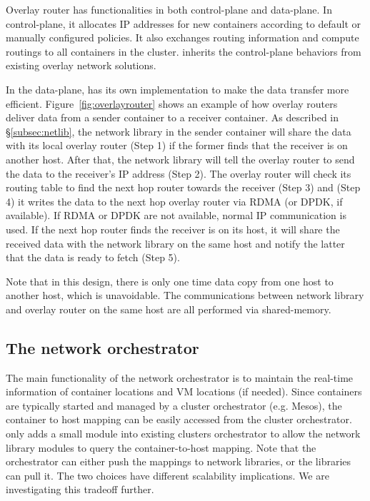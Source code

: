 Overlay router has functionalities in both control-plane and data-plane.
In control-plane, it allocates IP addresses for new containers according to
default or manually configured policies. It also exchanges routing information
and compute routings to all containers in the cluster. \sysname inherits 
the control-plane behaviors from existing overlay network solutions.

In the data-plane, \sysname has its own implementation to make the data transfer
more efficient. Figure~\ref{fig:overlayrouter} shows an example of how 
overlay routers deliver data from a sender container to a receiver container.
As described in \S\ref{subsec:netlib},
the network library in the sender container will share the data with
its local overlay router (Step 1) if the former finds that the receiver 
is on another host. After that, the network library will tell
the overlay router to send the data to the receiver's IP address (Step 2).
The overlay router will check its routing table to find the next hop router
towards the receiver (Step 3) and (Step 4) it writes the data to the next hop overlay
router via RDMA (or DPDK, if available). If RDMA or DPDK are not available,
normal IP communication is used. If the next hop router finds the receiver is on its
host, it will share the received data with the network library on the same host
and notify the latter that the data is ready to fetch (Step 5).

Note that in this design, there is only one time data copy from one host
to another host, which is unavoidable. The communications between network library
and overlay router on the same host are all performed via shared-memory.

\subsection{The network orchestrator}

The main functionality of the network orchestrator is to maintain the real-time
information of container locations and VM locations (if needed).  Since
containers are typically started and managed by a cluster orchestrator (e.g.
Mesos), the container to host mapping can be easily accessed from the cluster
orchestrator. \sysname only adds a small module into existing clusters
orchestrator to allow the network library modules to query the container-to-host
mapping. Note that the orchestrator can either push the mappings to network
libraries, or the libraries can pull it. The two choices have different
scalability implications. We are investigating this tradeoff further.

